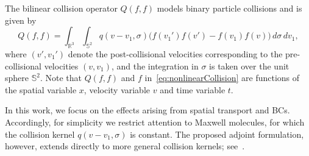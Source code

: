 \documentclass[12pt,nopreprintline]{elsarticle}
\begin{document}
The bilinear collision operator $Q(f,f)$ models binary particle collisions and is given by
\begin{equation}
\label{eq:nonlinearCollision}
Q(f,f)
=
\int_{\mathbb{R}^3}
\int_{\mathbb{S}^2}
q(v-v_1,\sigma)
\bigl(
f(v_1') f(v') - f(v_1) f(v)
\bigr)
\, d\sigma \, dv_1,
\end{equation}
where $(v', v_1')$ denote the post-collisional velocities corresponding to the pre-collisional velocities $(v, v_1)$, and the integration in $\sigma$ is taken over the unit sphere $\mathbb{S}^2$. Note that $Q(f,f)$ and  $f$ in~\eqref{eq:nonlinearCollision} are functions of the spatial variable $x$, velocity variable $v$ and time variable $t$.

In this work, we focus on the effects arising from spatial transport and BCs. Accordingly, for simplicity we restrict attention to Maxwell molecules, for which the collision kernel $q(v-v_1,\sigma)$ is constant. The proposed adjoint formulation, however, extends directly to more general collision kernels; see~\cite{yang2023adjoint}.
\end{document}
